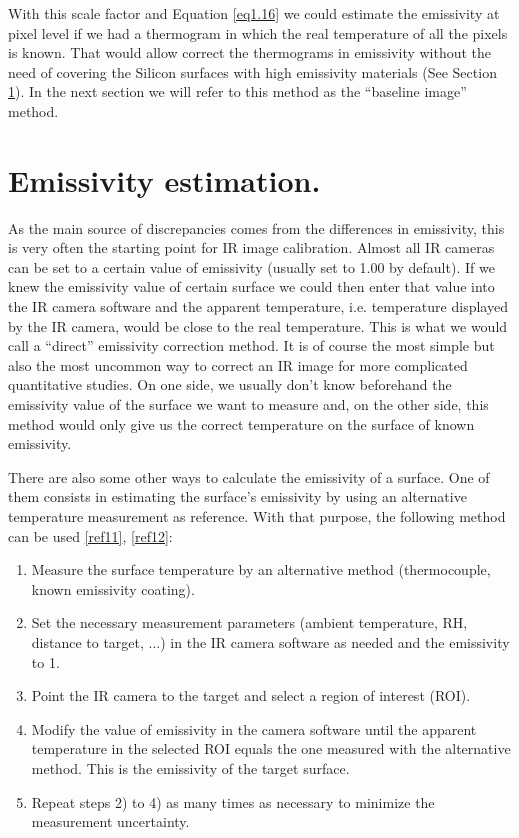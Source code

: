 		With this scale factor and Equation \ref{eq1.16} we could estimate the emissivity at pixel level if we had a thermogram in which the real temperature of all the pixels is known. That would allow correct the thermograms in emissivity without the need of covering the Silicon surfaces with high emissivity materials (See Section \ref{section3.3}). In the next section we will refer to this method as the “baseline image” method.\bigskip
		
	\section{Emissivity estimation. }\label{section3.3}
		
		As the main source of discrepancies comes from the differences in emissivity, this is very often the starting point for IR image calibration. Almost all IR cameras can be set to a certain value of emissivity (usually set to 1.00 by default). If we knew the emissivity value of certain surface we could then enter that value into the IR camera software and the apparent temperature, i.e. temperature displayed by the IR camera, would be close to the real temperature. This is what we would call a “direct” emissivity correction method. It is of course the most simple but also the most uncommon way to correct an IR image for more complicated quantitative studies. On one side, we usually don’t know beforehand the emissivity value of the surface we want to measure and, on the other side, this method would only give us the correct temperature on the surface of known emissivity.
		
		There are also some other ways to calculate the emissivity of a surface. One of them consists in estimating the surface’s emissivity by using an alternative temperature measurement as reference. With that purpose, the following method can be used  \ref{ref11}, \ref{ref12}:
		
		\begin{enumerate}[label={\arabic*)}]
			\item Measure the surface temperature by an alternative method (thermocouple, known emissivity coating).
			\item Set the necessary measurement parameters (ambient temperature, RH, distance to target, ...) in the IR camera software as needed and the emissivity to 1.
			\item Point the IR camera to the target and select a region of interest (ROI).
			\item Modify the value of emissivity in the camera software until the apparent temperature in the selected ROI equals the one measured with the alternative method. This is the emissivity of the target surface.
			\item Repeat steps 2) to 4) as many times as necessary to minimize the measurement uncertainty.
		\end{enumerate}
	
